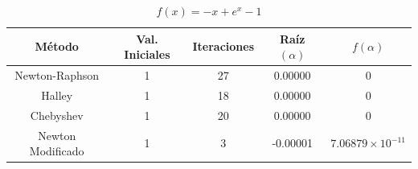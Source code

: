 \begin{table}[H]
\centering

\renewcommand{\arraystretch}{1.3} %
\setlength{\tabcolsep}{12pt}      %

\begin{tabular}{ccccc}
\hline
Método & Val. Iniciales & Iteraciones & Raíz $(\alpha)$ & $f(\alpha)$ \\
\hline

Newton-Raphson    & 1 & 27 & 0.00000  & 0                    \\

Halley            & 1 & 18 & 0.00000  & 0                    \\

Chebyshev         & 1 & 20 & 0.00000  & 0                    \\

Newton Modificado & 1 &  3 & -0.00001 & $7.06879\times10^{-11}$ \\

\hline
\end{tabular}

\caption{$f(x) = - x + e^{x} - 1$}
\end{table}


